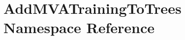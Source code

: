 \hypertarget{namespaceAddMVATrainingToTrees}{
\section{AddMVATrainingToTrees Namespace Reference}
\label{namespaceAddMVATrainingToTrees}
}
